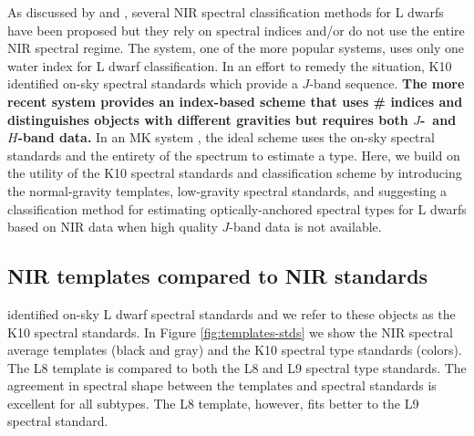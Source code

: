 \documentclass[12pt,preprint]{aastex}
\begin{document}
As discussed by \citet[\S~3.2]{Kirkpatrick05} and \citet[abbreviated as K10]{Kirkpatrick10}, several NIR spectral classification methods for L dwarfs have been proposed but they rely on spectral indices and/or do not use the entire NIR spectral regime. The \citet{Geballe02} system, one of the more popular systems, uses only one water index for L dwarf classification. In an effort to remedy the situation, K10 identified on-sky spectral standards which provide a $J$-band sequence. 
\textbf{The more recent \citet{Allers:2013hk} system provides an index-based scheme that uses \# indices and distinguishes objects with different gravities but requires both $J$-~and $H$-band data.}
In an MK system \citep{Morgan:1984wy}, the ideal scheme uses the on-sky spectral standards and the entirety of the spectrum to estimate a type. 
Here, we build on the utility of the K10 spectral standards and classification scheme by introducing the normal-gravity templates, low-gravity spectral standards, and suggesting a classification method for estimating optically-anchored spectral types for L dwarfs based on NIR data when high quality $J$-band data is not available.

\subsection{NIR templates compared to NIR standards}

\citet{Kirkpatrick10} identified on-sky L dwarf spectral standards and we refer to these objects as the K10 spectral standards. In Figure \ref{fig:templates-stds} we show the NIR spectral average templates (black and gray) and the K10 spectral type standards (colors). The L8 template is compared to both the L8 and L9 spectral type standards. The agreement in spectral shape between the templates and spectral standards is excellent for all subtypes. The L8 template, however, fits better to the L9 spectral standard.
\end{document}
